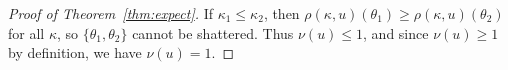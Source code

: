 \documentclass[12pt]{article}
\theoremstyle{definition}
\theoremstyle{remark}
\newcommand{\paramspace}{\Theta}
\newcommand{\param}{\theta}
\newcommand{\reals}{\mathbf{R}}
\newcommand{\termov}{s}
\newcommand{\lt}{\kappa}
\newcommand{\classif}{\rho}
\newcommand{\vc}{\nu}
\newcommand{\paramspace}{\Theta}
\newcommand{\param}{\theta}
\newcommand{\reals}{\mathbf{R}}
\newcommand{\termov}{s}
\newcommand{\lt}{\kappa}
\newcommand{\classif}{\rho}
\newcommand{\vc}{\nu}
\theoremstyle{plain}
\theoremstyle{definition}
\theoremstyle{remark}
\begin{document}
\begin{proof}[Proof of Theorem~\ref{thm:expect}]
    If $\lt_1 \le \lt_2$, then $\classif(\lt, u)(\param_1) \ge \classif(\lt, u)(\param_2)$ for all $\lt$, so $\{\param_1, \param_2\}$ cannot be shattered.
    Thus $\vc(u) \le 1$, and since $\vc(u) \ge 1$ by definition, we have $\vc(u) = 1$.
\end{proof}
\end{document}
